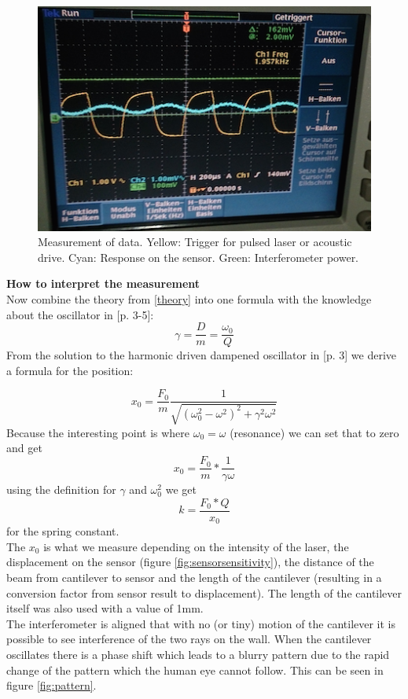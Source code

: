 \documentclass[12pt,a4paper]{article}
\begin{document}
\begin{figure}[H]
	\centering
	\includegraphics[scale=1]{../figures/messung.png}
	\caption{Measurement of data. Yellow:  Trigger for pulsed laser or acoustic drive. Cyan: Response on the sensor. Green: Interferometer power.}
	\label{fig:measurement}
\end{figure}

\textbf{How to interpret the measurement}\\
Now combine the theory from \ref{theory} into one formula with the knowledge about the oscillator in \cite{physikwiki}[p. 3-5]:
$$\gamma = \frac{D}{m} = \frac{\omega_0}{Q}$$
From the solution to the harmonic driven dampened oscillator in \cite{physikwiki}[p. 3] we derive a formula for the position:

$$x_0 = \frac{F_0}{m}  \frac{1}{\sqrt{ (\omega_0^2 - \omega^2 )^2 + \gamma^2  \omega^2}}$$
Because the interesting point is where $\omega_0 = \omega$ (resonance) we can set that to zero and get
$$x_0 = \frac{F_0}{m} * \frac{1}{\gamma  \omega}$$
using the definition for $\gamma$ and $\omega_0^2$ we get
$$k = \frac{F_0 * Q}{x_0}$$
for the spring constant.\\
The $x_0$ is what we measure depending on the intensity of the laser, the displacement on the sensor (figure \ref{fig:sensorsensitivity}), the distance of the beam from cantilever to sensor and the length of the cantilever (resulting in a conversion factor from sensor result to displacement). The length of the cantilever itself was also used with a value of 1mm.\\

\noindent
The interferometer is aligned that with no (or tiny) motion of the cantilever it is possible to see interference of the two rays on the wall. When the cantilever oscillates there is a phase shift which leads to a blurry pattern due to the rapid change of the pattern which the human eye cannot follow. This can be seen in figure \ref{fig:pattern}.
\end{document}
